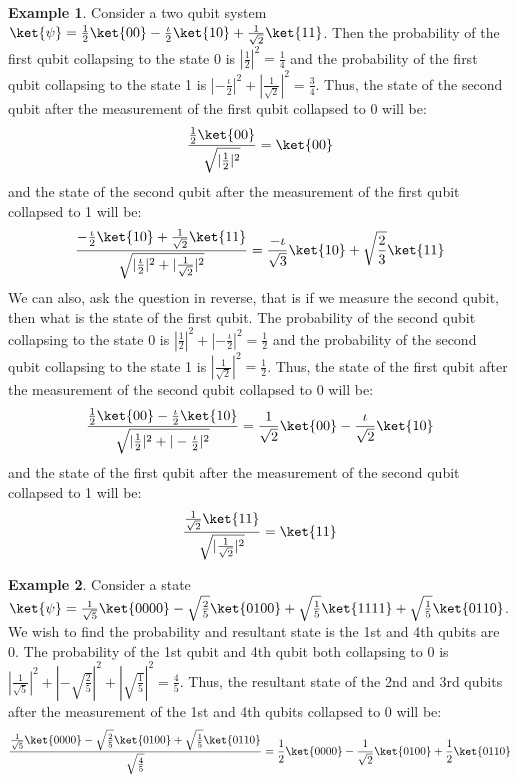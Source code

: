 \documentclass[12pt, oneside]{book}
\theoremstyle{definition}
\theoremstyle{definition}
\newtheorem{example}{Example}[section]
\theoremstyle{remark}
\begin{document}
\begin{example}
    Consider a two qubit system $\ket{\psi}=\frac{1}{2}\ket{00}-\frac{\iota}{2}\ket{10}+\frac{1}{\sqrt{2}}\ket{11}$.
    Then the probability of the first qubit collapsing to the state 0 is $|\frac{1}{2}|^2=\frac{1}{4}$ and the probability of the first qubit collapsing to the state 1 is $|-\frac{\iota}{2}|^2+|\frac{1}{\sqrt{2}}|^2=\frac{3}{4}$.
    Thus, the state of the second qubit after the measurement of the first qubit collapsed to 0 will be:
    \[
        \dfrac{\frac{1}{2}\ket{00}}{\sqrt{|\frac{1}{2}|^2}}=\ket{00}
    \]
    and the state of the second qubit after the measurement of the first qubit collapsed to 1 will be:
    \[
        \dfrac{-\frac{\iota}{2}\ket{10}+\frac{1}{\sqrt{2}}\ket{11}}{\sqrt{|\frac{\iota}{2}|^2+|\frac{1}{\sqrt{2}}|^2}}=\frac{-\iota}{\sqrt{3}}\ket{10}+\sqrt{\frac{2}{3}}\ket{11}
    \]
    We can also, ask the question in reverse, that is if we measure the second qubit, then what is the state of the first qubit. 
    The probability of the second qubit collapsing to the state 0 is $|\frac{1}{2}|^2+|-\frac{\iota}{2}|^2=\frac{1}{2}$ and the probability of the second qubit collapsing to the state 1 is $|\frac{1}{\sqrt{2}}|^2=\frac{1}{2}$.
    Thus, the state of the first qubit after the measurement of the second qubit collapsed to 0 will be:
    \[
        \dfrac{\frac{1}{2}\ket{00}-\frac{\iota}{2}\ket{10}}{\sqrt{|\frac{1}{2}|^2+|-\frac{\iota}{2}|^2}}=\frac{1}{\sqrt{2}}\ket{00}-\frac{\iota}{\sqrt{2}}\ket{10}
    \]
    and the state of the first qubit after the measurement of the second qubit collapsed to 1 will be:
    \[
        \dfrac{\frac{1}{\sqrt{2}}\ket{11}}{\sqrt{|\frac{1}{\sqrt{2}}|^2}}=\ket{11}
    \]
\end{example}

\begin{example}
    Consider a state $\ket{\psi}=\frac{1}{\sqrt{5}}\ket{0000}-\sqrt{\frac{2}{5}}\ket{0100} +\sqrt{\frac{1}{5}}\ket{1111}+\sqrt{\frac{1}{5}}\ket{0110}$.
    We wish to find the probability and resultant state is the 1st and 4th qubits are 0.
    The probability of the 1st qubit and 4th qubit both collapsing to 0 is $|\frac{1}{\sqrt{5}}|^2+|-\sqrt{\frac{2}{5}}|^2+|\sqrt{\frac{1}{5}}|^2=\frac{4}{5}$.
    Thus, the resultant state of the 2nd and 3rd qubits after the measurement of the 1st and 4th qubits collapsed to 0 will be:
    \[
        \dfrac{\frac{1}{\sqrt{5}}\ket{0000}-\sqrt{\frac{2}{5}}\ket{0100}+\sqrt{\frac{1}{5}}\ket{0110}}{\sqrt{\frac{4}{5}}}=\frac{1}{2}\ket{0000}-\frac{1}{\sqrt{2}}\ket{0100}+\frac{1}{2}\ket{0110}
    \] 
\end{example}
\end{document}
